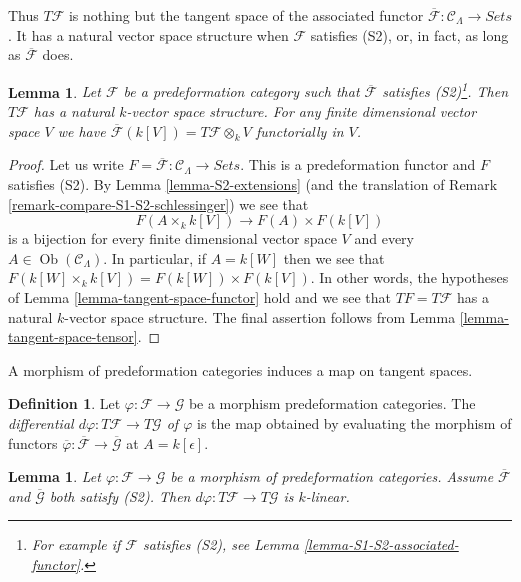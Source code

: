 \documentclass{stacks-project}
\theoremstyle{plain}
\newtheorem{lemma}[subsection]{Lemma}
\theoremstyle{definition}
\newtheorem{definition}[subsection]{Definition}
\theoremstyle{remark}
\numberwithin{equation}{subsection}
\def\Ob{\mathop{\mathrm{Ob}}\nolimits}
\begin{document}
\noindent
Thus $T \mathcal{F}$ is nothing but the tangent space of the associated
functor $\overline{\mathcal{F}}: \mathcal{C}_\Lambda \to \textit{Sets}$.
It has a natural vector space structure when $\mathcal{F}$ satisfies (S2),
or, in fact, as long as $\overline{\mathcal{F}}$ does.

\begin{lemma}
\label{lemma-tangent-space-vector-space}
Let $\mathcal{F}$ be a predeformation category such that
$\overline{\mathcal{F}}$ satisfies (S2)\footnote{For example
if $\mathcal{F}$ satisfies (S2), see
Lemma \ref{lemma-S1-S2-associated-functor}.}. Then $T \mathcal{F}$ has a
natural $k$-vector space structure. For any finite dimensional
vector space $V$ we have
$\overline{\mathcal{F}}(k[V]) = T\mathcal{F} \otimes_k V$
functorially in $V$.
\end{lemma}

\begin{proof}
Let us write
$F = \overline{\mathcal{F}} : \mathcal{C}_\Lambda \to \textit{Sets}$.
This is a predeformation functor and $F$ satisfies (S2). By
Lemma \ref{lemma-S2-extensions}
(and the translation of
Remark \ref{remark-compare-S1-S2-schlessinger})
we see that
$$
F(A \times_k k[V]) \longrightarrow F(A) \times F(k[V])
$$
is a bijection for every finite dimensional vector space $V$ and every
$A \in \Ob(\mathcal{C}_\Lambda)$. In particular, if $A = k[W]$
then we see that $F(k[W] \times_k k[V]) = F(k[W]) \times F(k[V])$.
In other words, the hypotheses of
Lemma \ref{lemma-tangent-space-functor}
hold and we see that $TF = T \mathcal{F}$
has a natural $k$-vector space structure.
The final assertion follows from
Lemma \ref{lemma-tangent-space-tensor}.
\end{proof}

\noindent
A morphism of predeformation categories induces a map on tangent spaces.

\begin{definition}
\label{definition-differential}
Let $\varphi : \mathcal{F} \to \mathcal{G}$ be a morphism predeformation
categories. The
{\it differential $d \varphi : T \mathcal{F} \to T \mathcal{G}$ of $\varphi$}
is the map obtained by evaluating the morphism of functors
$\overline{\varphi}: \overline{\mathcal{F}} \to \overline{\mathcal{G}}$
at $A = k[\epsilon]$.
\end{definition}

\begin{lemma}
\label{lemma-k-linear-differential}
Let $\varphi : \mathcal{F} \to \mathcal{G}$ be a morphism of predeformation
categories. Assume $\overline{\mathcal{F}}$ and $\overline{\mathcal{G}}$ both
satisfy (S2). Then $d \varphi : T \mathcal{F} \to T \mathcal{G}$ is $k$-linear.
\end{lemma}
\end{document}
